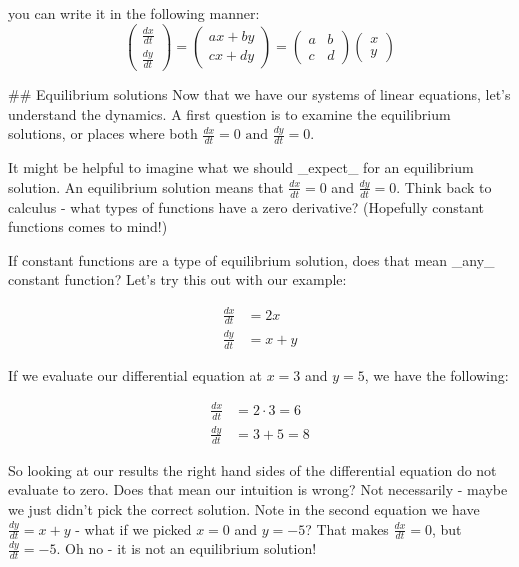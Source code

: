 \documentclass[
]{book}
\theoremstyle{definition}
\theoremstyle{definition}
\theoremstyle{definition}
\theoremstyle{remark}
\begin{document}
you can write it in the following manner:
\begin{equation}
\begin{pmatrix} \frac{dx}{dt} \\ \frac{dy}{dt} \end{pmatrix} =  \begin{pmatrix} ax+by \\ cx+dy \end{pmatrix} =  \begin{pmatrix} a & b \\ c &  d \end{pmatrix} \begin{pmatrix} x \\ y \end{pmatrix}
\end{equation}

## Equilibrium solutions
Now that we have our systems of linear equations, let's understand the dynamics.  A first question is to examine the equilibrium solutions, or places where both $\displaystyle \frac{dx}{dt}=0 \mbox{ and } \frac{dy}{dt}=0$.

It might be helpful to imagine what we should _expect_ for an equilibrium solution.  An equilibrium solution means that $\displaystyle \frac{dx}{dt} = 0$ and $\displaystyle \frac{dy}{dt} = 0$.  Think back to calculus - what types of functions have a zero derivative?  (Hopefully constant functions comes to mind!)

If constant functions are a type of equilibrium solution, does that mean _any_ constant function? Let's try this out with our example:

\begin{equation}
\begin{split}
\frac{dx}{dt} &= 2x \\ 
\frac{dy}{dt} &= x+y
\end{split}
\end{equation}

If we evaluate our differential equation at $x=3$ and $y=5$, we have the following:

\begin{equation}
\begin{split}
\frac{dx}{dt} &= 2\cdot 3 = 6 \\ 
\frac{dy}{dt} &= 3+5 = 8
\end{split}
\end{equation}

So looking at our results the right hand sides of the differential equation do not evaluate to zero.  Does that mean our intuition is wrong? Not necessarily - maybe we just didn't pick the correct solution.  Note in the second equation we have $\displaystyle \frac{dy}{dt}= x+y$ - what if we picked $x=0$ and $y=-5$?  That makes $\displaystyle \frac{dx}{dt}=0$, but $\displaystyle \frac{dy}{dt}=-5$.  Oh no - it is not an equilibrium solution!
\end{document}
